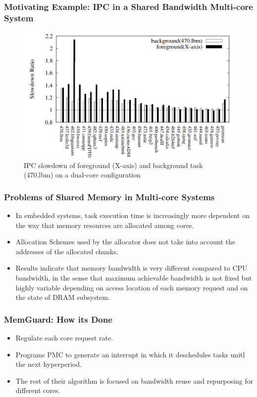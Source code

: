 \documentclass{beamer}
\begin{document}
\begin{frame}
    \frametitle{Motivating Example: IPC in a Shared Bandwidth Multi-core System}
    \begin{figure}
        \centering
        \includegraphics[width=0.80\columnwidth]{memguard.png}
        \caption{IPC slowdown of foreground (X-axis) and background
        task (470.lbm) on a dual-core configuration}
        \label{fig:TraceEnable}
    \end{figure}
\end{frame}

\begin{frame}
    \frametitle{Problems of Shared Memory in Multi-core Systems}
    \begin{itemize}
        \item In embedded systems, task execution time is increasingly more
            dependent on the way that memory resources are allocated among
            cores.
        \item Allocation Schemes used by the allocator does not take into
            account the addresses of the allocated chunks.
        \item Results indicate that memory bandwidth is very different
            compared to CPU bandwidth, in the sense that maximum achievable
            bandwidth is not fixed but highly variable depending on access
            location of each memory request and on the state of DRAM subsystem.
    \end{itemize}
\end{frame}

\begin{frame}
    \frametitle{MemGuard: How its Done}
    \begin{itemize}
        \item Regulate each core request rate.
        \item Programs PMC to generate an interrupt in which it deschedules
            tasks unitl the next hyperperiod.
        \item The rest of their algorithm is focused on bandwidth reuse and
            repurposing for different cores.
    \end{itemize}
\end{frame}
\end{document}
